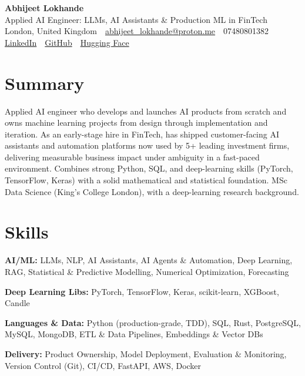 \documentclass[10pt,a4paper]{article}
\newcommand{\sep}{\,\textcolor{accent!60}{\textbar}\,}
\begin{document}
\begin{center}
  {\fontsize{24}{26}\selectfont\bfseries Abhijeet Lokhande}\\[3pt]
  {\color{accent}\large Applied AI Engineer: LLMs, AI Assistants \& Production ML in FinTech}\\[5pt]
  {\small
    London, United Kingdom \sep
    \href{mailto:abhijeet_lokhande@proton.me}{abhijeet\_lokhande@proton.me} \sep
    07480801382 \\[2pt]
    \href{https://www.linkedin.com/in/ablds/}{LinkedIn} \sep
    \href{https://github.com/abhijeetscode}{GitHub} \sep
    \href{https://huggingface.co/ab-ai}{Hugging Face}
  }
\end{center}
\vspace{2pt}

\section{Summary}
Applied AI engineer who develops and launches AI products from scratch and owns machine learning projects from design through implementation and iteration. As an early-stage hire in FinTech, has shipped customer-facing AI assistants and automation platforms now used by 5+ leading investment firms, delivering measurable business impact under ambiguity in a fast-paced environment. Combines strong Python, SQL, and deep-learning skills (PyTorch, TensorFlow, Keras) with a solid mathematical and statistical foundation. MSc Data Science (King's College London), with a deep-learning research background.

\section{Skills}
\begin{tight}
  \item[\textcolor{accent}{\small$\bullet$}] \textbf{AI/ML:} LLMs, NLP, AI Assistants, AI Agents \& Automation, Deep Learning, RAG, Statistical \& Predictive Modelling, Numerical Optimization, Forecasting
  \item[\textcolor{accent}{\small$\bullet$}] \textbf{Deep Learning Libs:} PyTorch, TensorFlow, Keras, scikit-learn, XGBoost, Candle
  \item[\textcolor{accent}{\small$\bullet$}] \textbf{Languages \& Data:} Python (production-grade, TDD), SQL, Rust, PostgreSQL, MySQL, MongoDB, ETL \& Data Pipelines, Embeddings \& Vector DBs
  \item[\textcolor{accent}{\small$\bullet$}] \textbf{Delivery:} Product Ownership, Model Deployment, Evaluation \& Monitoring, Version Control (Git), CI/CD, FastAPI, AWS, Docker
\end{tight}
\end{document}
